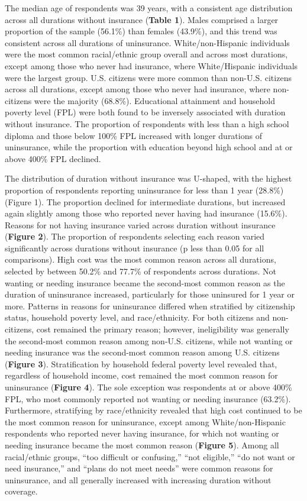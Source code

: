 \documentclass[12pt]{article}
\begin{document}
The median age of respondents was 39 years, with a consistent age distribution across all durations without insurance (\textbf{Table 1}). Males comprised a larger proportion of the sample (56.1\%) than females (43.9\%), and this trend was consistent across all durations of uninsurance. White/non-Hispanic individuals were the most common racial/ethnic group overall and across most durations, except among those who never had insurance, where White/Hispanic individuals were the largest group. U.S. citizens were more common than non-U.S. citizens across all durations, except among those who never had insurance, where non-citizens were the majority (68.8\%). Educational attainment and household poverty level (FPL) were both found to be inversely associated with duration without insurance. The proportion of respondents with less than a high school diploma and those below 100\% FPL increased with longer durations of uninsurance, while the proportion with education beyond high school and at or above 400\% FPL declined.

The distribution of duration without insurance was U-shaped, with the highest proportion of respondents reporting uninsurance for less than 1 year (28.8\%) (Figure 1). The proportion declined for intermediate durations, but increased again slightly among those who reported never having had insurance (15.6\%). Reasons for not having insurance varied across duration without insurance (\textbf{Figure 2}). The proportion of respondents selecting each reason varied significantly across durations without insurance (p less than 0.05 for all comparisons). High cost was the most common reason across all durations, selected by between 50.2\% and 77.7\% of respondents across durations. Not wanting or needing insurance became the second-most common reason as the duration of uninsurance increased, particularly for those uninsured for 1 year or more. Patterns in reasons for uninsurance differed when stratified by citizenship status, household poverty level, and race/ethnicity. For both citizens and non-citizens, cost remained the primary reason; however, ineligibility was generally the second-most common reason among non-U.S. citizens, while not wanting or needing insurance was the second-most common reason among U.S. citizens (\textbf{Figure 3}). Stratification by household federal poverty level revealed that, regardless of household income, cost remained the most common reason for uninsurance (\textbf{Figure 4}). The sole exception was respondents at or above 400\% FPL, who most commonly reported not wanting or needing insurance (63.2\%). Furthermore, stratifying by race/ethnicity revealed that high cost continued to be the most common reason for uninsurance, except among White/non-Hispanic respondents who reported never having insurance, for which not wanting or needing insurance became the most common reason (\textbf{Figure 5}). Among all racial/ethnic groups, “too difficult or confusing,” “not eligible,” “do not want or need insurance,” and “plans do not meet needs” were common reasons for uninsurance, and all generally increased with increasing duration without coverage.
\end{document}
